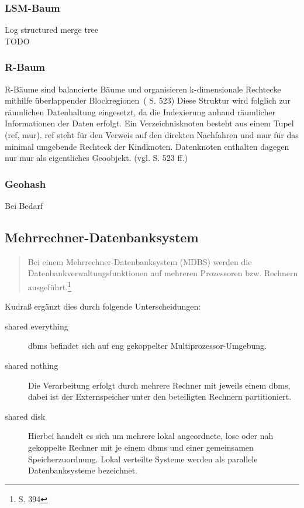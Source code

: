 \subsubsection{LSM-Baum}
Log structured merge tree\\
TODO

\subsubsection{R-Baum}
R-Bäume sind balancierte Bäume und \glqq organisieren k-dimensionale Rechtecke mithilfe überlappender Blockregionen\grqq \ (\cite{book:kudrass} S. 523)
Diese Struktur wird folglich zur räumlichen Datenhaltung eingesetzt, da die Indexierung anhand räumlicher Informationen der Daten erfolgt.
Ein Verzeichnisknoten besteht aus einem Tupel (ref, mur).
ref steht für den Verweis auf den direkten Nachfahren und mur für das minimal umgebende Rechteck der Kindknoten.
Datenknoten enthalten dagegen nur mur als eigentliches Geoobjekt. (vgl. \cite{book:kudrass} S. 523 ff.)

\subsubsection{Geohash}
\label{geohash}
Bei Bedarf

\subsection{Mehrrechner-Datenbanksystem}

\begin{quote}
Bei einem Mehrrechner-Datenbanksystem (MDBS) werden die Datenbankverwaltungsfunktionen auf mehreren Prozessoren bzw. Rechnern ausgeführt.\footnote{\cite{book:kudrass} S. 394}
\end{quote}
Kudraß ergänzt dies durch folgende Unterscheidungen:
\begin{description}
\item[shared everything] \Gls{dbms} befindet sich auf eng gekoppelter Multiprozessor-Umgebung.
\item[shared nothing] Die Verarbeitung erfolgt durch mehrere Rechner mit jeweils einem \Gls{dbms}, dabei ist der Externspeicher unter den beteiligten Rechnern partitioniert.
\item[shared disk] Hierbei handelt es sich um mehrere lokal angeordnete, lose oder nah gekoppelte Rechner mit je einem \Gls{dbms} und einer gemeinsamen Speicherzuordnung. Lokal verteilte Systeme werden als parallele Datenbanksysteme bezeichnet.
\end{description}

